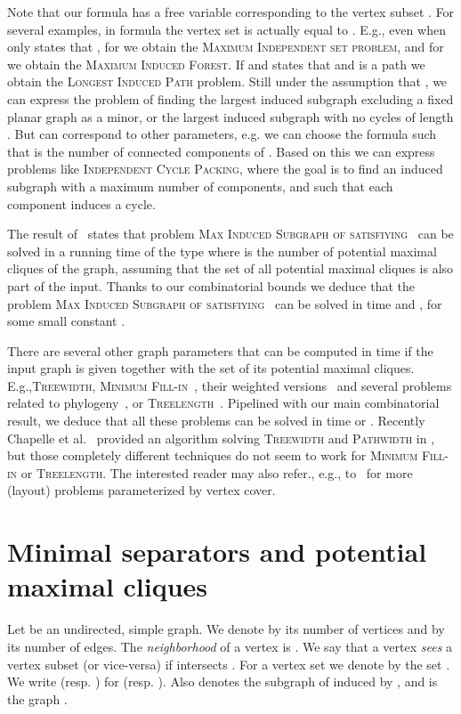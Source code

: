 \documentclass{llncs}
\newcommand{\pmc}{potential maximal clique}
\newcommand{\msphit}{\textsc{Max\- Induced\- Subgraph\- of\- \- satisfiying\- }}
\begin{document}
Note that our formula  has a free variable corresponding to the vertex subset . 
 For several examples, in  formula  the vertex set  is actually equal to . E.g., even when  only states that , for  we obtain the \textsc{Maximum Independent set problem}, and for  we obtain the \textsc{Maximum Induced Forest}. If  and   states that  and  is a path we obtain the \textsc{Longest Induced Path} problem. Still under the assumption that , we can express the problem of finding the largest induced subgraph  excluding a fixed planar graph  as a minor, or the largest induced subgraph with no cycles of length . But  can correspond to other parameters, e.g. we can choose the formula  such that  is the number of connected components of . Based on this we can express problems like \textsc{Independent Cycle Packing}, where the goal is to find an induced subgraph with a maximum number of components, and such that each component induces a cycle. 


The result of~\cite{FoToVi14} states that problem \msphit\ can be solved in a running time of the type  where  is the number of potential maximal cliques of the graph, assuming that the set of all potential maximal cliques is also part of the input. 
Thanks to our combinatorial bounds we deduce that the problem \msphit\  can be solved in time  and  , for some small constant .

There are several other graph parameters that can be computed in time  if the input graph is given together with the set of its potential maximal cliques. E.g.,\textsc{Treewidth}, \textsc{Minimum Fill-in}~\cite{FKTV08}, their weighted versions~\cite{BoFo05,Gysel13} and several problems related to phylogeny~\cite{Gysel13},  or  \textsc{Treelength}~\cite{Lokshtanov10}. Pipelined with our main combinatorial result, we deduce that all these problems can be solved in time  or . Recently Chapelle et al.~\cite{CLTV13} provided an algorithm solving \textsc{Treewidth} and \textsc{Pathwidth} in  , but those completely different techniques do not seem to work for \textsc{Minimum Fill-in} or \textsc{Treelength}. The interested reader may also refer., e.g., to~\cite{CLP+14,FLM+08} for more (layout) problems parameterized by vertex cover.



\section{Minimal separators and \pmc s}\label{se:prelim}


Let  be an undirected, simple graph. We denote by  its number of vertices and by  its number of edges. The \emph{neighborhood} of a vertex  is
. We say that a vertex  \emph{sees} a vertex subset  (or vice-versa) if  intersects .
For a vertex set  we denote by  the set . We write  (resp. ) for  (resp. ). 
Also  denotes the subgraph of  induced by , and  is the graph . 
\end{document}
